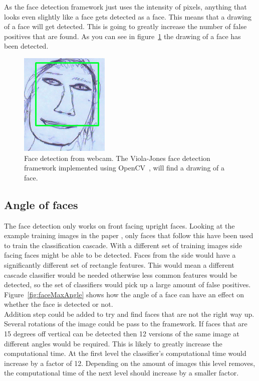 \documentclass[10pt,a4paper,openbib]{article}
\begin{document}
\begin{multicols}{2}
\noindent As the face detection framework just uses the intensity of pixels, anything that looks even slightly like a face gets detected as a face. This means that a drawing of a face will get detected. This is going to greatly increase the number of false positives that are found. As you can see in figure~\ref{fig:faceDrawing} the drawing of a face has been detected. 

\begin{figure}[H]
\begin{center}
\includegraphics[scale=0.4]{images/faceDrawing.png} 
\caption{Face detection from webcam. The Viola-Jones face detection framework implemented using OpenCV~\cite{faceCode}, will find a drawing of a face.}
\label{fig:faceDrawing}
\end{center}
\end{figure}

\subsection{Angle of faces}

The face detection only works on front facing upright faces. Looking at the example training images in the paper \cite{violaJones}, only faces that follow this have been used to train the classification cascade. With a different set of training images side facing faces might be able to be detected. Faces from the side would have a significantly different set of rectangle features. This would mean a different cascade classifier would be needed otherwise less common features would be detected, so the set of classifiers would pick up a large amount of false positives. Figure~\ref{fig:faceMaxAngle} shows how the angle of a face can have an effect on whether the face is detected or not. \\

\noindent Addition step could be added to try and find faces that are not the right way up. Several rotations of the image could be pass to the framework. If faces that are 15 degrees off vertical can be detected then 12 versions of the same image at different angles would be required. This is likely to greatly increase the computational time. At the first level the classifier's computational time would increase by a factor of 12. Depending on the amount of images this level removes, the computational time of the next level should increase by a smaller factor. \\


\end{multicols}
\end{document}
